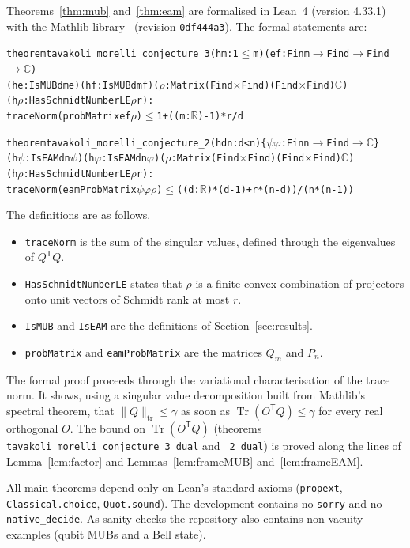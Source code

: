 \documentclass[11pt]{amsart}
\theoremstyle{definition}
\theoremstyle{remark}
\newcommand{\Tr}{\operatorname{Tr}}
\newcommand{\tr}{\mathrm{tr}}
\newcommand{\lean}[1]{\texttt{#1}}
\begin{document}
Theorems~\ref{thm:mub} and~\ref{thm:eam} are formalised in Lean~4 (version 4.33.1)~\cite{Lean4} with the Mathlib
library~\cite{Mathlib2020} (revision \texttt{0df444a3}). The formal statements are:
\begin{alltt}\footnotesize
theorem tavakoli_morelli_conjecture_3 (hm : 1 \(\le\) m) (e f : Fin m \(\to\) Fin d \(\to\) Fin d \(\to\) \(\mathbb{C}\))
    (he : IsMUB d m e) (hf : IsMUB d m f) (\(\rho\) : Matrix (Fin d \(\times\) Fin d) (Fin d \(\times\) Fin d) \(\mathbb{C}\))
    (h\(\rho\) : HasSchmidtNumberLE \(\rho\) r) :
    traceNorm (probMatrix e f \(\rho\)) \(\le\) 1 + ((m : \(\mathbb{R}\)) - 1) * r / d

theorem tavakoli_morelli_conjecture_2 (hdn : d < n) \{\(\psi\) \(\varphi\) : Fin n \(\to\) Fin d \(\to\) \(\mathbb{C}\)\}
    (h\(\psi\) : IsEAM d n \(\psi\)) (h\(\varphi\) : IsEAM d n \(\varphi\)) (\(\rho\) : Matrix (Fin d \(\times\) Fin d) (Fin d \(\times\) Fin d) \(\mathbb{C}\))
    (h\(\rho\) : HasSchmidtNumberLE \(\rho\) r) :
    traceNorm (eamProbMatrix \(\psi\) \(\varphi\) \(\rho\)) \(\le\) ((d : \(\mathbb{R}\)) * (d - 1) + r * (n - d)) / (n * (n - 1))
\end{alltt}
The definitions are as follows.
\begin{itemize}
\item \lean{traceNorm} is the sum of the singular values, defined through the eigenvalues of $Q^{\mathsf T}Q$.
\item \lean{HasSchmidtNumberLE} states that $\rho$ is a finite convex combination of projectors onto unit vectors
of Schmidt rank at most $r$.
\item \lean{IsMUB} and \lean{IsEAM} are the definitions of Section~\ref{sec:results}.
\item \lean{probMatrix} and \lean{eamProbMatrix} are the matrices $Q_m$ and $P_n$.
\end{itemize}
The formal proof proceeds through the variational characterisation of the trace norm. It shows, using a singular
value decomposition built from Mathlib's spectral theorem, that $\|Q\|_{\tr}\le\gamma$ as soon as
$\Tr(O^{\mathsf T}Q)\le\gamma$ for every real orthogonal $O$. The bound on $\Tr(O^{\mathsf T}Q)$ (theorems
\lean{tavakoli\_morelli\_conjecture\_3\_dual} and \lean{\_2\_dual}) is proved along the lines of
Lemma~\ref{lem:factor} and Lemmas~\ref{lem:frameMUB} and~\ref{lem:frameEAM}.

All main theorems depend only on Lean's standard axioms (\lean{propext}, \lean{Classical.choice},
\lean{Quot.sound}). The development contains no \lean{sorry} and no \lean{native\_decide}. As sanity checks the
repository also contains non-vacuity examples (qubit MUBs and a Bell state).
\end{document}
